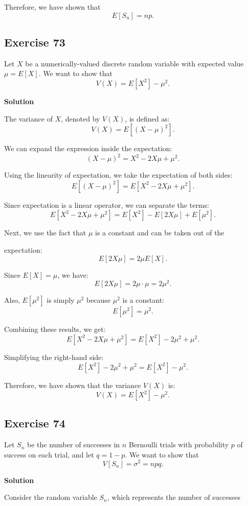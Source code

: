 \documentclass{article}
\begin{document}
Therefore, we have shown that
\[
E[S_n] = np.
\]

\subsection*{Exercise 73}

Let \(X\) be a numerically-valued discrete random variable with expected value \(\mu = E[X]\). We want to show that
\[
V(X) = E[X^2] - \mu^2.
\]

\textbf{Solution}

The variance of \(X\), denoted by \(V(X)\), is defined as:
\[
V(X) = E[(X - \mu)^2].
\]

We can expand the expression inside the expectation:
\[
(X - \mu)^2 = X^2 - 2X\mu + \mu^2.
\]

Using the linearity of expectation, we take the expectation of both sides:
\[
E[(X - \mu)^2] = E[X^2 - 2X\mu + \mu^2].
\]

Since expectation is a linear operator, we can separate the terms:
\[
E[X^2 - 2X\mu + \mu^2] = E[X^2] - E[2X\mu] + E[\mu^2].
\]

Next, we use the fact that \(\mu\) is a constant and can be taken out of the 

expectation:
\[
E[2X\mu] = 2\mu E[X].
\]

Since \(E[X] = \mu\), we have:
\[
E[2X\mu] = 2\mu \cdot \mu = 2\mu^2.
\]

Also, \(E[\mu^2]\) is simply \(\mu^2\) because \(\mu^2\) is a constant:
\[
E[\mu^2] = \mu^2.
\]

Combining these results, we get:
\[
E[X^2 - 2X\mu + \mu^2] = E[X^2] - 2\mu^2 + \mu^2.
\]

Simplifying the right-hand side:
\[
E[X^2] - 2\mu^2 + \mu^2 = E[X^2] - \mu^2.
\]

Therefore, we have shown that the variance \(V(X)\) is:
\[
V(X) = E[X^2] - \mu^2.
\]

\subsection*{Exercise 74}

Let \( S_n \) be the number of successes in \( n \) Bernoulli trials with probability \( p \) of success on each trial, and let \( q = 1 - p \). We want to show that
\[
V[S_n] = \sigma^2 = npq.
\]

\textbf{Solution}

Consider the random variable \( S_n \), which represents the number of successes 
\end{document}
